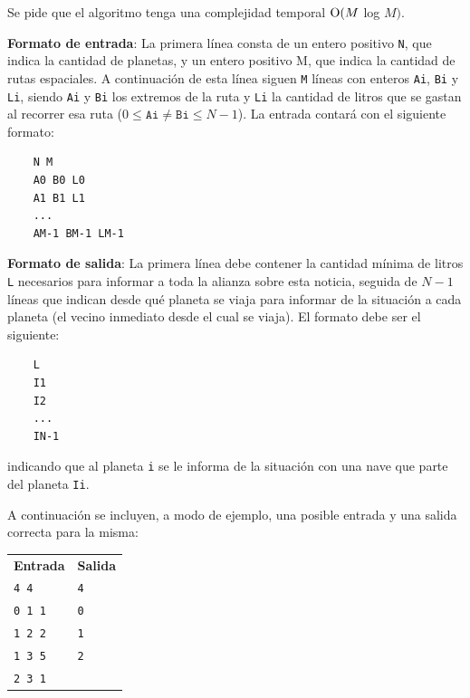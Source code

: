     Se pide que el algoritmo tenga una complejidad temporal $\operatorname{O}(M$ log $M)$.

    \vspace{1.25em}

    \textbf{Formato de entrada}: La primera línea consta de un entero positivo \texttt{N}, que indica la cantidad de planetas, y un entero positivo M, que indica la cantidad de rutas espaciales. A continuación de esta línea siguen \texttt{M} líneas con enteros \texttt{Ai}, \texttt{Bi} y \texttt{Li}, siendo \texttt{Ai} y \texttt{Bi} los extremos de la ruta y \texttt{Li} la cantidad de litros que se gastan al recorrer esa ruta ($0 \leq \mathtt{Ai} \neq \mathtt{Bi} \leq N-1$). La entrada contará con el siguiente formato:

    \begin{verbatim}
    N M
    A0 B0 L0
    A1 B1 L1
    ...
    AM-1 BM-1 LM-1\end{verbatim}

    \vspace{.8em}

    \textbf{Formato de salida}: La primera línea debe contener la cantidad mínima de litros \texttt{L} necesarios para informar a toda la alianza sobre esta noticia, seguida de $N-1$ líneas que indican desde qué planeta se viaja para informar de la situación a cada planeta (el vecino inmediato desde el cual se viaja). El formato debe ser el siguiente:

    \begin{verbatim}
    L
    I1
    I2
    ...
    IN-1\end{verbatim}

    indicando que al planeta \texttt{i} se le informa de la situación con una nave que parte del planeta \texttt{Ii}.

    \vspace{.8em}

    A continuación se incluyen, a modo de ejemplo, una posible entrada y una
    salida correcta para la misma:

    \vspace{.5em}
    \begin{tabular}{l @{\hskip 4em} l}
    \textbf{Entrada} & \textbf{Salida} \\
    \texttt{4 4}     & \texttt{4}      \\
    \texttt{0 1 1}   & \texttt{0}      \\
    \texttt{1 2 2}   & \texttt{1}      \\
    \texttt{1 3 5}   & \texttt{2}      \\
    \texttt{2 3 1}   &                 \\
    \end{tabular}
    \vspace{.5em}

